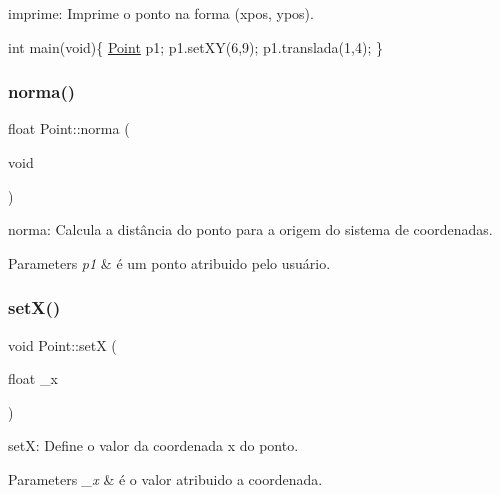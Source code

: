 imprime\+: Imprime o ponto na forma (xpos, ypos). 


\begin{DoxyPre}
int main(void)\{
   \mbox{\hyperlink{class_point}{Point}} p1;
   p1.setXY(6,9);
   p1.translada(1,4);
\}
\end{DoxyPre}
 \mbox{\label{class_point_aa3005a9d97e2cb05624414973a214788}} 
\subsubsection{\texorpdfstring{norma()}{norma()}}
{\footnotesize\ttfamily float Point\+::norma (\begin{DoxyParamCaption}\item[{void}]{ }\end{DoxyParamCaption})}



norma\+: Calcula a distância do ponto para a origem do sistema de coordenadas. 


\begin{DoxyParams}{Parameters}
{\em p1} & é um ponto atribuido pelo usuário. \\
\hline
\end{DoxyParams}
\mbox{\label{class_point_a428a1676e2fdec6753c42011a1d59d18}} 
\subsubsection{\texorpdfstring{set\+X()}{setX()}}
{\footnotesize\ttfamily void Point\+::setX (\begin{DoxyParamCaption}\item[{float}]{\+\_\+x }\end{DoxyParamCaption})}



setX\+: Define o valor da coordenada x do ponto. 


\begin{DoxyParams}{Parameters}
{\em \+\_\+x} & é o valor atribuido a coordenada. \\
\hline
\end{DoxyParams}
\mbox{\label{class_point_ab5385c6d9bfa841e641e4709fc9f14cc}} 
